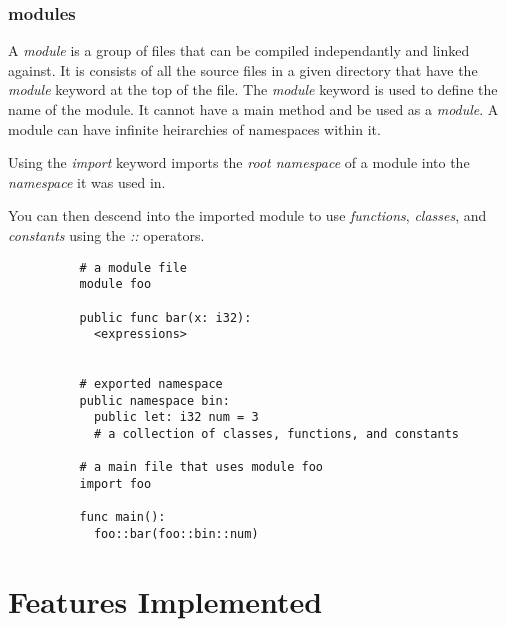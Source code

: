 \documentclass{article}
\newcommand{\centersec}[1]{\section*{\hfil #1 \hfil}}
\begin{document}
      \subsubsection*{modules}
        A \textit{module} is a group of files that can be compiled independantly
        and linked against. It is consists of all the source files in a given directory
        that have the \textit{module} keyword at the top of the file. The \textit{module}
        keyword is used to define the name of the module. It cannot have a main
        method and be used as a \textit{module}. A module can have infinite
        heirarchies of namespaces within it.

        Using the \textit{import} keyword imports the \textit{root namespace} of a module into the
        \textit{namespace} it was used in.

        You can then descend into the imported module to use \textit{functions},
        \textit{classes}, and \textit{constants} using the \textit{::} operators.

        \begin{verbatim}
          # a module file
          module foo

          public func bar(x: i32):
            <expressions>


          # exported namespace
          public namespace bin:
            public let: i32 num = 3
            # a collection of classes, functions, and constants

          # a main file that uses module foo
          import foo

          func main():
            foo::bar(foo::bin::num)
        \end{verbatim}

  \centersec{Features Implemented}
\end{document}
